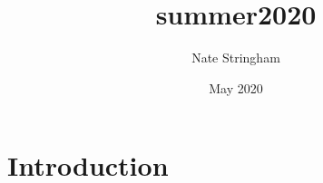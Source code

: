 \documentclass{article}
\title{summer2020}
\author{Nate Stringham}
\date{May 2020}
\begin{document}
\maketitle

\section{Introduction}
\end{document}
